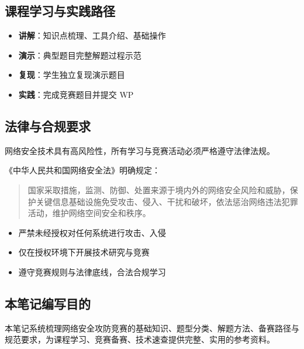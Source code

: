 \subsection{课程学习与实践路径}
\begin{itemize}[leftmargin=*]
    \item \textbf{讲解}：知识点梳理、工具介绍、基础操作
    \item \textbf{演示}：典型题目完整解题过程示范
    \item \textbf{复现}：学生独立复现演示题目
    \item \textbf{实践}：完成竞赛题目并提交 WP
\end{itemize}

\subsection{法律与合规要求}
网络安全技术具有高风险性，所有学习与竞赛活动必须严格遵守法律法规。

《中华人民共和国网络安全法》明确规定：
\begin{quote}
国家采取措施，监测、防御、处置来源于境内外的网络安全风险和威胁，保护关键信息基础设施免受攻击、侵入、干扰和破坏，依法惩治网络违法犯罪活动，维护网络空间安全和秩序。
\end{quote}

\begin{itemize}[leftmargin=*]
    \item 严禁未经授权对任何系统进行攻击、入侵
    \item 仅在授权环境下开展技术研究与竞赛
    \item 遵守竞赛规则与法律底线，合法合规学习
\end{itemize}

\subsection{本笔记编写目的}
本笔记系统梳理网络安全攻防竞赛的基础知识、题型分类、解题方法、备赛路径与规范要求，为课程学习、竞赛备赛、技术速查提供完整、实用的参考资料。
